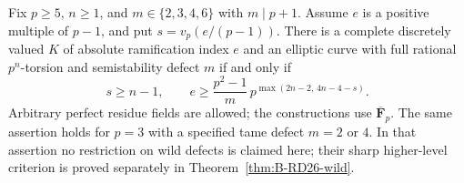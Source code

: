 \begin{theorem}\label{thm:B-RD12}
Fix $p\geq5$, $n\geq1$, and $m\in\{2,3,4,6\}$ with $m\mid p+1$.
Assume $e$ is a positive multiple of $p-1$, and put
$s=v_p(e/(p-1))$. There is a complete discretely valued $K$ of absolute
ramification index $e$ and an elliptic curve with full rational
$p^n$-torsion and semistability defect $m$ if and only if
\[
 s\geq n-1,\qquad
 e\geq\frac{p^2-1}{m}\,
        p^{\max(2n-2,\,4n-4-s)}.                  \tag{B.12.1}
\]
Arbitrary perfect residue fields are allowed; the constructions use
$\overline{\mathbf F}_p$. The same assertion holds for $p=3$ with a
specified tame defect $m=2$ or $4$. In that assertion no restriction on
wild defects is claimed here; their sharp higher-level criterion is proved separately in Theorem~\ref{thm:B-RD26-wild}.
\end{theorem}
